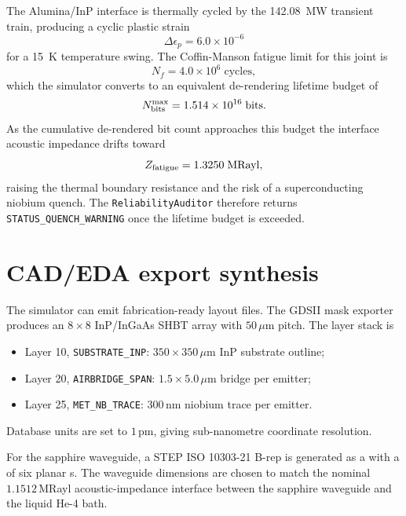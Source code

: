 \documentclass[aps,pra,10pt,onecolumn,superscriptaddress,nofootinbib,longbibliography,floatfix]{revtex4-2}
\begin{document}
The Alumina/InP interface is thermally cycled by the 142.08~MW transient train, producing a cyclic plastic strain
%
\begin{equation}
\Delta\epsilon_p = 6.0 \times 10^{-6}
\end{equation}
%
for a 15~K temperature swing.  The Coffin-Manson fatigue limit for this joint is
%
\begin{equation}
N_f = 4.0 \times 10^{6}\;\mathrm{cycles} ,
\end{equation}
%
which the simulator converts to an equivalent de-rendering lifetime budget of
%
\begin{equation}
N_{\rm bits}^{\max} = 1.514 \times 10^{16}\;\mathrm{bits} .
\end{equation}
%
As the cumulative de-rendered bit count approaches this budget the interface acoustic impedance drifts toward
%
\begin{equation}
Z_{\rm fatigue} = 1.3250\;\mathrm{MRayl} ,
\end{equation}
%
raising the thermal boundary resistance and the risk of a superconducting niobium quench.  The \texttt{ReliabilityAuditor} therefore returns \texttt{STATUS\_QUENCH\_WARNING} once the lifetime budget is exceeded.

\section{CAD/EDA export synthesis}

The simulator can emit fabrication-ready layout files.  The GDSII mask exporter produces an $8 \times 8$ InP/InGaAs SHBT array with $50\,\mu$m pitch.  The layer stack is
%
\begin{itemize}
\item Layer 10, \texttt{SUBSTRATE\_INP}: $350 \times 350\,\mu$m InP substrate outline;
\item Layer 20, \texttt{AIRBRIDGE\_SPAN}: $1.5 \times 5.0\,\mu$m bridge per emitter;
\item Layer 25, \texttt{MET\_NB\_TRACE}: $300\,$nm niobium trace per emitter.
\end{itemize}
%
Database units are set to $1\,$pm, giving sub-nanometre coordinate resolution.

For the sapphire waveguide, a STEP ISO 10303-21 B-rep is generated as a  with a  of six planar s.  The waveguide dimensions are chosen to match the nominal $1.1512\,$MRayl acoustic-impedance interface between the sapphire waveguide and the liquid He-4 bath.
\end{document}
